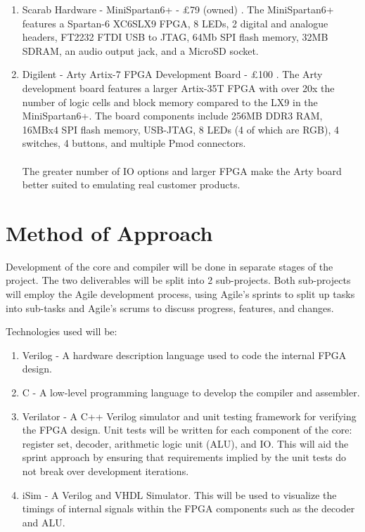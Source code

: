 \documentclass[11pt,a4paper]{article}
\begin{document}
\begin{enumerate}
\item{Scarab Hardware - MiniSpartan6+ - £79 (owned) \citep{scarabhardware}. The MiniSpartan6+ features a Spartan-6 XC6SLX9 FPGA, 8 LEDs, 2 digital and analogue headers, FT2232 FTDI USB to JTAG, 64Mb SPI flash memory, 32MB SDRAM, an audio output jack, and a MicroSD socket.}

\item{Digilent - Arty Artix-7 FPGA Development Board - £100 \citep{artry}. The Arty development board features a larger Artix-35T FPGA with over 20x the number of logic cells and block memory compared to the LX9 in the MiniSpartan6+. The board components include 256MB DDR3 RAM, 16MBx4 SPI flash memory, USB-JTAG, 8 LEDs (4 of which are RGB), 4 switches, 4 buttons, and multiple Pmod connectors.
\\\\
The greater number of IO options and larger FPGA make the Arty board better suited to emulating real customer products.
}
\end{enumerate}

\section{Method of Approach}
Development of the core and compiler will be done in separate stages of the project. The two deliverables will be split into 2 sub-projects. Both sub-projects will employ the Agile development process, using Agile's sprints to split up tasks into sub-tasks and Agile's scrums to discuss progress, features, and changes.

Technologies used will be:
\begin{enumerate}
\item{Verilog - A hardware description language used to code the internal FPGA design.}

\item{C - A low-level programming language to develop the compiler and assembler.}

\item{Verilator - A C++ Verilog simulator and unit testing framework for verifying the FPGA design. Unit tests will be written for each component of the core: register set, decoder, arithmetic logic unit (ALU), and IO. This will aid the sprint approach by ensuring that requirements implied by the unit tests do not break over development iterations.}

\item{iSim - A Verilog and VHDL Simulator. This will be used to visualize the timings of internal signals within the FPGA components such as the decoder and ALU.}
\end{enumerate}
\end{document}
